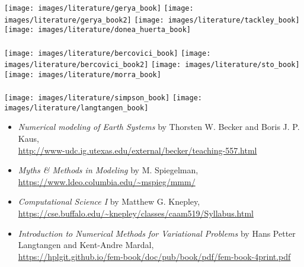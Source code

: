 
\begin{center}
\texttt{[image: images/literature/gerya\_book]}
\texttt{[image: images/literature/gerya\_book2]}
\texttt{[image: images/literature/tackley\_book]}
\texttt{[image: images/literature/donea\_huerta\_book]}\\
\cite{gery10}     \hspace{1.99cm} 
\cite{gery19book} \hspace{1.99cm} 
\cite{tack10}     \hspace{1.99cm} 
\cite{dohu03}  \\
\texttt{[image: images/literature/bercovici\_book]}
\texttt{[image: images/literature/bercovici\_book2]}
\texttt{[image: images/literature/sto\_book]}
\texttt{[image: images/literature/morra\_book]}\\
\cite{berc09} \hspace{1.99cm} 
\cite{berc15} \hspace{1.99cm} 
\cite{scto01} \hspace{1.99cm} 
\cite{morr18} \\ 
\texttt{[image: images/literature/simpson\_book]}
\texttt{[image: images/literature/langtangen\_book]}\\
\cite{simp17} \hspace{1.99cm}
\cite{lang08}
\end{center}

\begin{itemize}
\item {\it Numerical modeling of Earth Systems} by Thorsten W. Becker and Boris J. P. Kaus,\\ 
\url{http://www-udc.ig.utexas.edu/external/becker/teaching-557.html}

\item {\it Myths \& Methods in Modeling} by M. Spiegelman,\\
 \url{https://www.ldeo.columbia.edu/~mspieg/mmm/}

\item {\it Computational Science I} by Matthew G. Knepley,\\
 \url{https://cse.buffalo.edu/~knepley/classes/caam519/Syllabus.html}

\item {\it Introduction to Numerical Methods for Variational Problems} by Hans Petter Langtangen and 
Kent-Andre Mardal, \\
\url{https://hplgit.github.io/fem-book/doc/pub/book/pdf/fem-book-4print.pdf}
\end{itemize}

